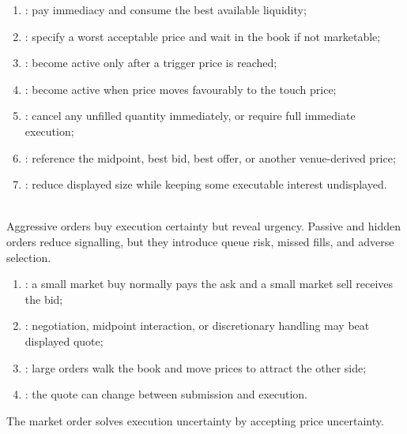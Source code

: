\documentclass[a4paper,oneside,openany]{book}
\begin{document}
\begin{taxonomy} 
\begin{enumerate}[label=\roman*.]
\setlength{\itemsep}{0pt}
\item {}: pay immediacy and consume the best available liquidity;
\item {}: specify a worst acceptable price and wait in the book if not marketable;
\item {}: become active only after a trigger price is reached;
\item {}: become active when price moves favourably to the touch price;
\item {}: cancel any unfilled quantity immediately, or require full immediate execution;
\item {}: reference the midpoint, best bid, best offer, or another venue-derived price;
\item {}: reduce displayed size while keeping some executable interest undisplayed.
\end{enumerate}
\end{taxonomy}

\begin{principle} \\
Aggressive orders buy execution certainty but reveal urgency. Passive and hidden orders reduce signalling, but they introduce queue risk, missed fills, and adverse selection.
\end{principle}

\begin{mechanism} 
\begin{enumerate}[label=\roman*.]
\setlength{\itemsep}{0pt}
\item {}: a small market buy normally pays the ask and a small market sell receives the bid;
\item {}: negotiation, midpoint interaction, or discretionary handling may beat displayed quote;
\item {}: large orders walk the book and move prices to attract the other side;
\item {}: the quote can change between submission and execution.
\end{enumerate}
The market order solves execution uncertainty by accepting price uncertainty.
\end{mechanism}
\end{document}

